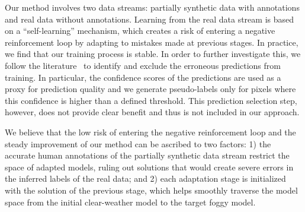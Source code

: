 \documentclass[twocolumn]{svjour3}          \smartqed  \usepackage{graphicx}
\begin{document}
Our method involves two data streams: partially synthetic data with annotations and real data without annotations. Learning from the real data stream is based on a ``self-learning'' mechanism, which creates a risk of entering a negative reinforcement loop by adapting to mistakes made at previous stages. In practice, we find that our training process is stable. 
In order to further investigate this, we follow the  literature~\cite{data:distillation:cvpr18} to identify and exclude the erroneous predictions from training. In particular, the confidence scores of the predictions are used as a proxy for prediction quality and we generate pseudo-labels only for pixels where this confidence is higher than a defined threshold. This prediction selection step, however, does not provide clear benefit and thus is not included in our approach. 

We believe that the low risk of entering the negative reinforcement loop and the steady improvement of our method can be ascribed to two factors: 1) the accurate human annotations of the partially synthetic data stream restrict the space of adapted models, ruling out solutions that would create severe errors in the inferred labels of the real data; and 2) each adaptation stage is initialized with the solution of the previous stage, which helps smoothly traverse the model space from the initial clear-weather model to the target foggy model.

   
\end{document}
